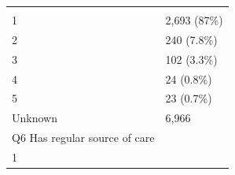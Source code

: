 \documentclass[]{article}
\begin{document}
\begin{longtable}[]{@{}ll@{}}
\begin{minipage}[t]{0.23\columnwidth}
\strut
\end{minipage}\tabularnewline
\begin{minipage}[t]{0.71\columnwidth}\raggedright
1\strut
\end{minipage} & \begin{minipage}[t]{0.23\columnwidth}\raggedright
2,693 (87\%)\strut
\end{minipage}\tabularnewline
\begin{minipage}[t]{0.71\columnwidth}\raggedright
2\strut
\end{minipage} & \begin{minipage}[t]{0.23\columnwidth}\raggedright
240 (7.8\%)\strut
\end{minipage}\tabularnewline
\begin{minipage}[t]{0.71\columnwidth}\raggedright
3\strut
\end{minipage} & \begin{minipage}[t]{0.23\columnwidth}\raggedright
102 (3.3\%)\strut
\end{minipage}\tabularnewline
\begin{minipage}[t]{0.71\columnwidth}\raggedright
4\strut
\end{minipage} & \begin{minipage}[t]{0.23\columnwidth}\raggedright
24 (0.8\%)\strut
\end{minipage}\tabularnewline
\begin{minipage}[t]{0.71\columnwidth}\raggedright
5\strut
\end{minipage} & \begin{minipage}[t]{0.23\columnwidth}\raggedright
23 (0.7\%)\strut
\end{minipage}\tabularnewline
\begin{minipage}[t]{0.71\columnwidth}\raggedright
Unknown\strut
\end{minipage} & \begin{minipage}[t]{0.23\columnwidth}\raggedright
6,966\strut
\end{minipage}\tabularnewline
\begin{minipage}[t]{0.71\columnwidth}\raggedright
Q6 Has regular source of care\strut
\end{minipage} & \begin{minipage}[t]{0.23\columnwidth}\raggedright
\strut
\end{minipage}\tabularnewline
\begin{minipage}[t]{0.71\columnwidth}\raggedright
1\strut
\end{minipage} & \begin{minipage}[t]{0.23\columnwidth}\raggedright

\end{minipage}
\end{longtable}
\end{document}
